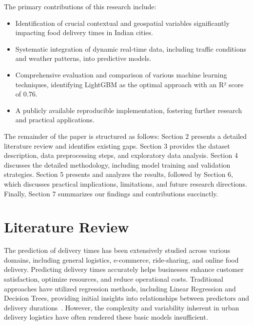 \documentclass[10pt,twocolumn,letterpaper]{article}
\begin{document}
The primary contributions of this research include:

\begin{itemize}
    \item Identification of crucial contextual and geospatial variables significantly impacting food delivery times in Indian cities.
    \item Systematic integration of dynamic real-time data, including traffic conditions and weather patterns, into predictive models.
    \item Comprehensive evaluation and comparison of various machine learning techniques, identifying LightGBM as the optimal approach with an R² score of 0.76.
    \item A publicly available reproducible implementation, fostering further research and practical applications.
\end{itemize}

The remainder of the paper is structured as follows: Section 2 presents a detailed literature review and identifies existing gaps. Section 3 provides the dataset description, data preprocessing steps, and exploratory data analysis. Section 4 discusses the detailed methodology, including model training and validation strategies. Section 5 presents and analyzes the results, followed by Section 6, which discusses practical implications, limitations, and future research directions. Finally, Section 7 summarizes our findings and contributions succinctly.

\section{Literature Review}

The prediction of delivery times has been extensively studied across various domains, including general logistics, e-commerce, ride-sharing, and online food delivery. Predicting delivery times accurately helps businesses enhance customer satisfaction, optimize resources, and reduce operational costs. Traditional approaches have utilized regression methods, including Linear Regression and Decision Trees, providing initial insights into relationships between predictors and delivery durations~\cite{scikit-learn}. However, the complexity and variability inherent in urban delivery logistics have often rendered these basic models insufficient.
\end{document}
